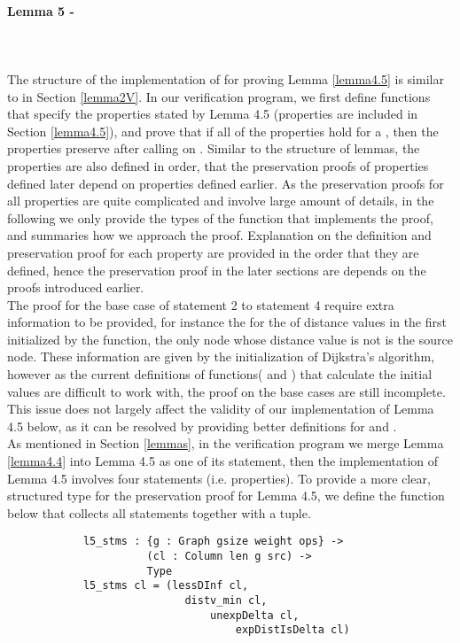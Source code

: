 \paragraph{Lemma 5 - } \label{lemma5V}
\tab\\\\
The structure of the implementation of  for proving Lemma \ref{lemma4.5} is similar to  in Section \ref{lemma2V}. In our verification program, we first define functions that specify the  properties stated by Lemma 4.5 (properties are included in Section \ref{lemma4.5}), and prove that if all of the properties hold for a  , then the properties preserve after calling  on . Similar to the structure of lemmas, the properties are also defined in order, that the preservation proofs of properties defined later depend on properties defined earlier. As the preservation proofs for all properties are quite complicated and involve large amount of details, in the following we only provide the types of the function that implements the proof, and summaries how we approach the proof. Explanation on the definition and preservation proof for each property are provided in the order that they are defined, hence the preservation proof in the later sections are depends on the proofs introduced earlier. 
\\

The proof for the base case of statement 2 to statement 4 require extra information to be provided, for instance the for the  of distance values in the first  initialized by the  function, the only node whose distance value is not  is the source node. These information are given by the initialization of Dijkstra's algorithm, however as the current definitions of functions( and ) that calculate the initial values are difficult to work with, the proof on the base cases are still incomplete. This issue does not largely affect the validity of our implementation of Lemma 4.5 below, as it can be resolved by providing better definitions for  and . 
\\

As mentioned in Section \ref{lemmas}, in the verification program we merge Lemma \ref{lemma4.4} into Lemma 4.5 as one of its statement, then the implementation of Lemma 4.5 involves four statements (i.e.  properties). To provide a more clear, structured type for the preservation proof for Lemma 4.5, we define the  function below that collects all statements together with a tuple. 
\begin{lstlisting}
			l5_stms : {g : Graph gsize weight ops} ->
			          (cl : Column len g src) ->
			          Type
			l5_stms cl = (lessDInf cl, 
							distv_min cl, 
								unexpDelta cl, 
									expDistIsDelta cl)
\end{lstlisting}


